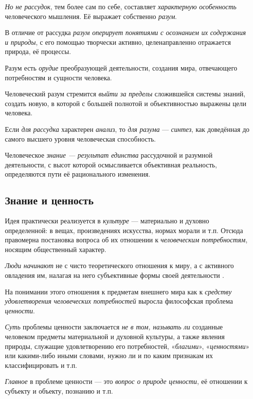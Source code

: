 \documentclass[a4paper,14pt,russian]{extreport}
\begin{document}
\emph{Но не рассудок}, тем более сам по себе, составляет \emph{характерную особенность} человеческого мышления. Её выражает собственно \emph{разум}.

В отличие от рассудка \emph{разум оперирует понятиями с осознанием их содержания и природы}, с его помощью творчески активно, целенаправленно отражается природа, её процессы.

Разум есть \emph{орудие} преобразующей деятельности, создания мира, отвечающего потребностям и сущности человека.

Человеческий разум стремится \emph{выйти за пределы} сложившейся системы знаний, создать новую, в которой с большей полнотой и объективностью выражены цели человека.

Если \emph{для рассудка} характерен \emph{анали}з, то \emph{для разума} --- \emph{синтез}, как доведённая до самого высшего уровня человеческая способность.

Человеческое \emph{знание --- результат единства} рассудочной и разумной деятельности, с высот которой осмысливается объективная реальность, определяются пути её рационального изменения.

\subsection{Знание и ценность}

Идея практически реализуется в \emph{культуре} --- материально и духовно определенной: в вещах, произведениях искусства, нормах морали и т.п. Отсюда правомерна постановка вопроса об их отношении к \emph{человеческим потребностям}, носящим общественный характер.

\emph{Люди начинают} не с чисто теоретического отношения к миру, а с активного овладения им, налагая на него субъективные формы своей деятельности .

На понимании этого отношения к предметам внешнего мира как к \emph{средству удовлетворения человеческих потребностей} выросла философская проблема \emph{ценности}.

\emph{Суть} проблемы ценности заключается \emph{не в том, называть ли} созданные человеком предметы материальной и духовной культуры, а также явления природы, служащие удовлетворению его потребностей, «\emph{благими}», «\emph{ценностями}» или какими-либо иными словами, нужно ли и по каким признакам их классифицировать и т.п.

\emph{Главное} в проблеме ценности --- это \emph{вопрос о природе ценности}, её отношении к субъекту и объекту, познанию и т.п.
\end{document}
